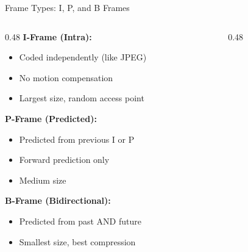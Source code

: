 \documentclass[aspectratio=169,12pt]{beamer}
\begin{document}
\begin{frame}{Frame Types: I, P, and B Frames}
    \begin{columns}
        \begin{column}{0.48\textwidth}
            \textbf{I-Frame (Intra):}
            \begin{itemize}
                \item Coded independently (like JPEG)
                \item No motion compensation
                \item Largest size, random access point
            \end{itemize}
            
            \vspace{0.15cm}
            \textbf{P-Frame (Predicted):}
            \begin{itemize}
                \item Predicted from previous I or P
                \item Forward prediction only
                \item Medium size
            \end{itemize}
            
            \vspace{0.15cm}
            \textbf{B-Frame (Bidirectional):}
            \begin{itemize}
                \item Predicted from past AND future
                \item Smallest size, best compression
            \end{itemize}
        \end{column}
        \begin{column}{0.48\textwidth}
            \begin{center}
\end{center}
\end{column}
\end{columns}
\end{frame}
\end{document}

